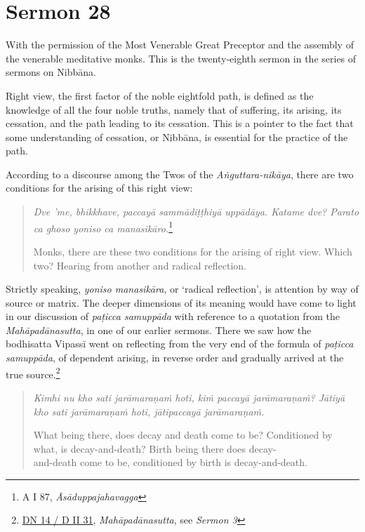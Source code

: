 \chapter{Sermon 28}

\NibbanaOpeningQuote

With the permission of the Most Venerable Great Preceptor and the assembly of the venerable meditative monks. This is the twenty-eighth sermon in the series of sermons on Nibbāna.

Right view, the first factor of the noble eightfold path, is defined as the knowledge of all the four noble truths, namely that of suffering, its arising, its cessation, and the path leading to its cessation. This is a pointer to the fact that some understanding of cessation, or Nibbāna, is essential for the practice of the path.

According to a discourse among the Twos of the \emph{Aṅguttara-nikāya}, there are two conditions for the arising of this right view:

\begin{quote}
\emph{Dve 'me, bhikkhave, paccayā sammādiṭṭhiyā uppādāya. Katame dve? Parato ca ghoso yoniso ca manasikāro.}\footnote{A I 87, \emph{Āsāduppajahavagga}}

Monks, there are these two conditions for the arising of right view. Which two? Hearing from another and radical reflection.
\end{quote}

Strictly speaking, \emph{yoniso manasikāra}, or `radical reflection', is attention by way of source or matrix. The deeper dimensions of its meaning would have come to light in our discussion of \emph{paṭicca samuppāda} with reference to a quotation from the \emph{Mahāpadānasutta}, in one of our earlier sermons. There we saw how the bodhisatta Vipassī went on reflecting from the very end of the formula of \emph{paṭicca samuppāda}, of dependent arising, in reverse order and gradually arrived at the true source.\footnote{\href{https://suttacentral.net/dn14/pli/ms}{DN 14 / D II 31}, \emph{Mahāpadānasutta}, see \emph{Sermon 3}}

\begin{quote}
\emph{Kimhi nu kho sati jarāmaraṇaṁ hoti, kiṁ paccayā jarāmaraṇaṁ? Jātiyā kho sati jarāmaraṇaṁ hoti, jātipaccayā jarāmaraṇaṁ.}

What being there, does decay and death come to be? Conditioned by what, is decay-and-death? Birth being there does decay-\\ and-death come to be, conditioned by birth is decay-and-death.
\end{quote}

